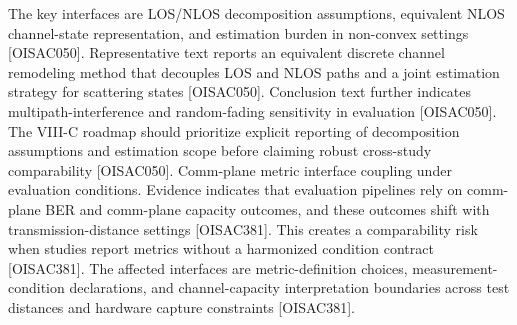  The key interfaces are LOS/NLOS decomposition assumptions, equivalent NLOS channel-state representation, and estimation burden in non-convex settings [O\markdownRendererUnderscore{}ISAC\markdownRendererUnderscore{}050].\markdownRendererOlItemEnd 
{} Representative text reports an equivalent discrete channel remodeling method that decouples LOS and NLOS paths and a joint estimation strategy for scattering states [O\markdownRendererUnderscore{}ISAC\markdownRendererUnderscore{}050]. Conclusion text further indicates multipath-interference and random-fading sensitivity in evaluation [O\markdownRendererUnderscore{}ISAC\markdownRendererUnderscore{}050].\markdownRendererOlItemEnd 
{} The VIII-C roadmap should prioritize explicit reporting of decomposition assumptions and estimation scope before claiming robust cross-study comparability [O\markdownRendererUnderscore{}ISAC\markdownRendererUnderscore{}050].\markdownRendererOlItemEnd 
\markdownRendererOlEnd \markdownRendererInterblockSeparator
{}
\markdownRendererSectionEnd \markdownRendererSectionBegin
{}\markdownRendererInterblockSeparator
{}\markdownRendererOlBegin
{} Comm-plane metric interface coupling under evaluation conditions.\markdownRendererOlItemEnd 
{} Evidence indicates that evaluation pipelines rely on comm-plane BER and comm-plane capacity outcomes, and these outcomes shift with transmission-distance settings [O\markdownRendererUnderscore{}ISAC\markdownRendererUnderscore{}381]. This creates a comparability risk when studies report metrics without a harmonized condition contract [O\markdownRendererUnderscore{}ISAC\markdownRendererUnderscore{}381].\markdownRendererOlItemEnd 
{} The affected interfaces are metric-definition choices, measurement-condition declarations, and channel-capacity interpretation boundaries across test distances and hardware capture constraints [O\markdownRendererUnderscore{}ISAC\markdownRendererUnderscore{}381].\markdownRendererOlItemEnd 
